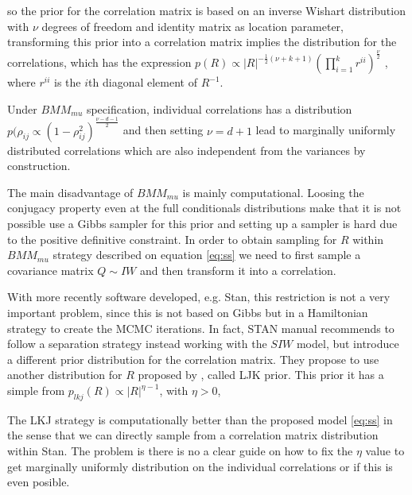\documentclass{article}
\begin{document}
so the prior for the correlation matrix is based on an inverse Wishart distribution with $\nu$ degrees of freedom and identity matrix as location parameter, transforming this prior into a correlation matrix implies the distribution for the correlations, which has the expression  $p(R) \propto |R|^{-\frac{1}{2}(\nu+k+1) }  (\prod_{i=1}^k r^{ii}) ^{\frac{\nu}{2}}$ , where $r^{ii}$ is the $i$th diagonal element of $R^{-1}$. 

Under $BMM_{mu}$ specification, individual correlations has a distribution $p(\rho_{ij} \propto (1-\rho_{ij}^2)^{\frac{\nu-d-1}{2}}$ and then setting $\nu=d+1$ lead to marginally uniformly distributed correlations which are also independent from the variances by construction. 


The main disadvantage of $BMM_{mu}$ is mainly computational. Loosing the conjugacy property even at the full conditionals distributions make that it is not possible use a Gibbs sampler for this prior and setting up a sampler is hard due to the positive definitive constraint. In order to obtain sampling for $R$ within $BMM_{mu}$ strategy described on equation \ref{eq:ss} we need to first sample a covariance matrix $Q \sim IW$ and then transform it  into a correlation. 

With more recently software developed, e.g. Stan, \citep{stan2014} this restriction is not a very important problem, since this is not based on Gibbs but in a Hamiltonian strategy to create the MCMC iterations.  In fact, STAN manual \citep{stanmanual2014} recommends to follow a separation strategy instead working with the $SIW$ model, but introduce a different prior distribution for the correlation matrix. They propose to use another distribution for $R$ proposed by \cite{lewandowski2009generating}, called LJK prior.   This prior it has a simple from $p_{lkj}(R) \propto |R|^{\eta-1}$, with $\eta > 0$, 

The LKJ strategy  is computationally better than the proposed model \ref{eq:ss} in the sense that we can directly sample from a correlation matrix distribution within Stan.  The problem is there is no a clear guide on how to fix the $\eta$ value to get marginally uniformly distribution on the individual correlations or if this is even posible. 
\end{document}
